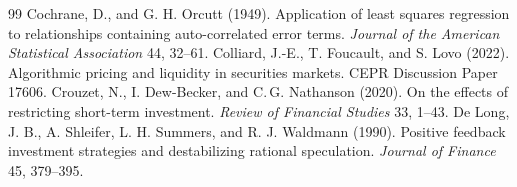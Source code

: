 \documentclass[12pt]{article}
\theoremstyle{definition}
\theoremstyle{remark}
\begin{document}
\begin{thebibliography}{99}
 Cochrane, D., and G. H. Orcutt (1949). Application of least squares regression to relationships containing auto-correlated error terms. \emph{Journal of the American Statistical Association} 44, 32--61.
 Colliard, J.-E., T. Foucault, and S. Lovo (2022). Algorithmic pricing and liquidity in securities markets. CEPR Discussion Paper 17606.
 Crouzet, N., I. Dew-Becker, and C.\,G. Nathanson (2020). On the effects of restricting short-term investment. \emph{Review of Financial Studies} 33, 1--43.
 De Long, J. B., A. Shleifer, L. H. Summers, and R. J. Waldmann (1990). Positive feedback investment strategies and destabilizing rational speculation. \emph{Journal of Finance} 45, 379--395.


\end{thebibliography}
\end{document}
